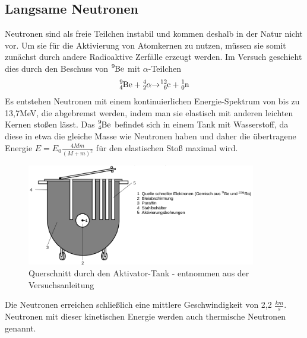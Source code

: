 	\subsection{Langsame Neutronen}
Neutronen sind als freie Teilchen instabil und kommen deshalb in der Natur nicht vor. Um sie für die Aktivierung von Atomkernen zu nutzen, müssen sie somit zunächst durch andere Radioaktive Zerfälle erzeugt werden. Im Versuch geschieht dies durch den Beschuss von $\ce{^9Be}$ mit $\alpha$-Teilchen
\begin{align}
	\ce{^9_4 Be + ^4_2\alpha \bond{->} ^{12}_6 c + ^1_0n}
\end{align}
Es entstehen Neutronen mit einem kontinuierlichen Energie-Spektrum von bis zu 13,7MeV, die abgebremst werden, indem man sie elastisch mit anderen leichten Kernen stoßen lässt. Das $\ce{^9_4 Be}$ befindet sich in einem Tank mit Wasserstoff, da diese in etwa die gleiche Masse wie Neutronen haben und daher die übertragene Energie $E = E_0 \frac{4Mm}{(M+m)^2}$ für den elastischen Stoß maximal wird.
\begin{figure}[H]
\includegraphics[width=10cm] {pics/aktivator.png}
\caption{Querschnitt durch den Aktivator-Tank - entnommen aus der Versuchsanleitung}
\end{figure}
Die Neutronen erreichen schließlich eine mittlere Geschwindigkeit von 2,2 $\frac{km}{s}$. Neutronen mit dieser kinetischen Energie werden auch thermische Neutronen genannt.
